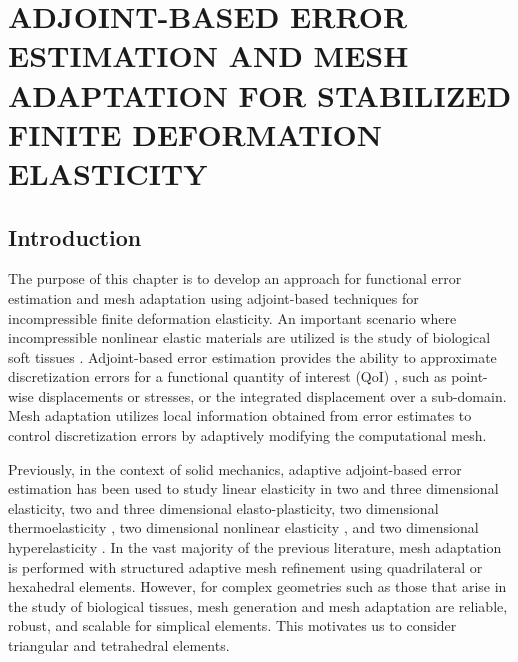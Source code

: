 \chapter{ADJOINT-BASED ERROR ESTIMATION AND MESH ADAPTATION
FOR STABILIZED FINITE DEFORMATION ELASTICITY}
\label{chap:mech}

\let\thefootnote\relax{}

\section{Introduction}

The purpose of this chapter is to develop an approach for functional error
estimation and mesh adaptation using adjoint-based techniques for
incompressible finite deformation elasticity. An important scenario where
incompressible nonlinear elastic materials are utilized is the study of
biological soft tissues \cite{legant2010measurement, paszek2005tensional,
discher2005tissue}. Adjoint-based error estimation provides the ability
to approximate discretization errors for a functional quantity of interest
(QoI) \cite{venditti2000adjoint, becker2001optimal, giles2002adjoint,
peraire1998bounds, prudhomme1999goal, braack2003posteriori,
bangerth2013adaptive}, such as point-wise displacements or stresses, or the
integrated displacement over a sub-domain. Mesh adaptation utilizes local
information obtained from error estimates to control discretization
errors by adaptively modifying the computational mesh.

Previously, in the context of solid mechanics, adaptive adjoint-based error
estimation has been used to study linear elasticity in two
\cite{rannacher1997feed, stein2007error, gonzalez2014mesh} and three
\cite{ghorashi2014goal} dimensional elasticity, two
\cite{rannacher1998posteriori, rannacher1999posteriori} and three
\cite{ghorashi2017goal} dimensional elasto-plasticity, two dimensional
thermoelasticity \cite{rabizadeh2015adaptive}, two dimensional nonlinear
elasticity \cite{larsson2002strategies}, and two dimensional
hyperelasticity \cite{whiteley2014error}. In the vast majority of the
previous literature, mesh adaptation is performed with structured adaptive
mesh refinement using quadrilateral or hexahedral elements. However, for
complex geometries such as those that arise in the study of biological
tissues, mesh generation and mesh adaptation are reliable, robust, and
scalable for simplical elements. This motivates us to consider triangular and
tetrahedral elements.

